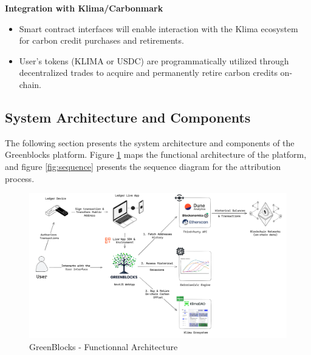 \documentclass[11pt]{report}
\begin{document}
\textbf{Integration with Klima/Carbonmark}

\begin{itemize}
    \item Smart contract interfaces will enable interaction with the Klima ecosystem for carbon credit purchases and retirements.
    \item User's tokens (KLIMA or USDC) are programmatically utilized through decentralized trades to acquire and permanently retire carbon credits on-chain.
\end{itemize}

\subsection{System Architecture and Components}
The following section presents the system architecture and components of the Greenblocks platform. Figure \ref{fig:functionnal_architecture} maps the functional architecture of the platform, and figure \ref{fig:sequence} presents the sequence diagram for the attribution process.

\begin{figure}[h!]
    \centering
    \centerline{\includegraphics[scale=0.077]{figures/functionnal architecture.png}}
    \caption{GreenBlocks - Functionnal Architecture}
    \label{fig:functionnal_architecture}
\end{figure}
\end{document}
